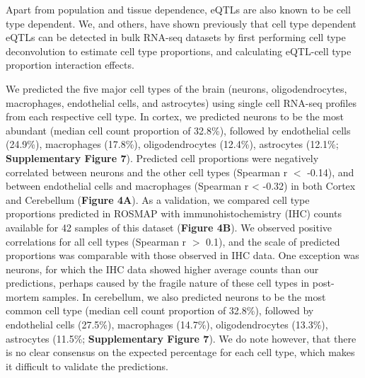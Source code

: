 Apart from population and tissue dependence, eQTLs are also known to be cell type dependent. We\cite{raulaguirre-gamboaDeconvolutionBulkBlood2020}, and others\cite{donovanCellularDeconvolutionGTEx2020,glastonburyCellTypeHeterogeneityAdipose2019}, have shown previously that cell type dependent eQTLs can be detected in bulk RNA-seq datasets by first performing cell type deconvolution to estimate cell type proportions, and calculating eQTL-cell type proportion interaction effects.  

We predicted the five major cell types of the brain (neurons, oligodendrocytes, macrophages, endothelial cells, and astrocytes) using single cell RNA-seq profiles from each respective cell type. In cortex, we predicted neurons to be the most abundant (median cell count proportion of 32.8\%), followed by endothelial cells (24.9\%), macrophages (17.8\%), oligodendrocytes (12.4\%), astrocytes (12.1\%; \textbf{Supplementary Figure 7}). Predicted cell proportions were negatively correlated between neurons and the other cell types (Spearman r $<$ -0.14), and between endothelial cells and macrophages (Spearman r < -0.32) in both Cortex and Cerebellum (\textbf{Figure 4A}). As a validation, we compared cell type proportions predicted in ROSMAP with immunohistochemistry (IHC) counts available for 42 samples of this dataset\cite{patrickDeconvolvingContributionsCelltype2020} (\textbf{Figure 4B}). We observed positive correlations for all cell types (Spearman r $>$ 0.1), and the scale of predicted proportions was comparable with those observed in IHC data. One exception was neurons, for which the IHC data showed higher average counts than our predictions, perhaps caused by the fragile nature of these cell types in post-mortem samples. In cerebellum, we also predicted neurons to be the most common cell type (median cell count proportion of 32.8\%), followed by endothelial cells (27.5\%), macrophages (14.7\%), oligodendrocytes (13.3\%), astrocytes (11.5\%; \textbf{Supplementary Figure 7}). We do note however, that there is no clear consensus on the expected percentage for each cell type, which makes it difficult to validate the predictions\cite{herculano-houzelHumanBrainNumbers2009,vonbartheldSearchTrueNumbers2016}. 

